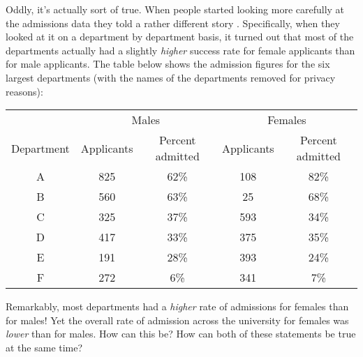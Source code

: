 Oddly, it's actually sort of true. When people started looking more carefully at the admissions data they told a rather different story \parencite{Bickel1975}. Specifically, when they looked at it on a department by department basis, it turned out that most of the departments actually had a slightly {\it higher} success rate for female applicants than for male applicants. The table below shows the admission figures for the six largest departments (with the names of the departments removed for privacy reasons):
\begin{center}
\begin{tabular}{c|cc|cc}
	& \multicolumn{2}{c|}{Males} & \multicolumn{2}{c}{Females} \\ 
	Department & Applicants	& Percent admitted &	Applicants & Percent admitted \\ \hline
A &	825	&62\%&	108&	82\% \\
B&	560	&63\%&	25	&68\% \\
C&	325	&37\%&	593	&34\%\\
D&	417	&33\%&	375	&35\%\\
E&	191	&28\%&	393	&24\%\\
F&	272	&6\%	&	341	&7\%\\
\end{tabular}
\end{center}
\noindent
Remarkably, most departments had a {\it higher} rate of admissions for females than for males! Yet the overall rate of admission across the university for females was {\it lower} than for males.  How can this be? How can both of these statements be true at the same time?

